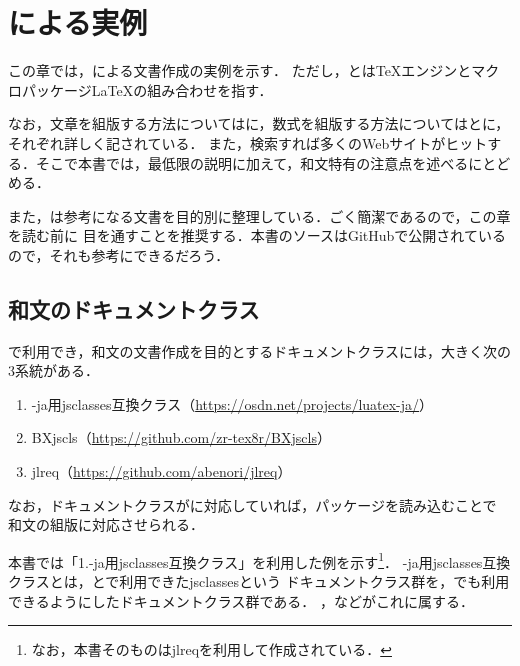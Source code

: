 \documentclass[../../index]{subfiles}
\begin{document}
\chapter{\LuaLaTeX による実例}
\label{chapter:lualatex}
この章では，\LuaLaTeX による文書作成の実例を示す．
ただし，\LuaLaTeX とは\TeX エンジン\LuaTeX とマクロパッケージ\LaTeX の組み合わせを指す．

なお，文章を組版する方法については\cite{Tobias2021}に，数式を組版する方法については\cite{ams2017}と\cite{ams2018}に，それぞれ詳しく記されている．
また，検索すれば多くのWebサイトがヒットする．そこで本書では，最低限の説明に加えて，和文特有の注意点を述べるにとどめる．

また，\cite{Manuel2021}は参考になる文書を目的別に整理している．ごく簡潔であるので，この章を読む前に
目を通すことを推奨する．本書のソースはGitHubで公開されているので，それも参考にできるだろう．

\section{和文のドキュメントクラス}
\LuaLaTeX で利用でき，和文の文書作成を目的とするドキュメントクラスには，大きく次の3系統がある．

\begin{enumerate}
  \item \LuaLaTeX -ja用jsclasses互換クラス（\url{https://osdn.net/projects/luatex-ja/}）
  \item BXjscls（\url{https://github.com/zr-tex8r/BXjscls}）
  \item jlreq（\url{https://github.com/abenori/jlreq}）
\end{enumerate}

なお，ドキュメントクラスが\LuaLaTeX に対応していれば，パッケージを読み込むことで
和文の組版に対応させられる．

本書では「1.\LuaLaTeX -ja用jsclasses互換クラス」を利用した例を示す\footnote{なお，本書そのものはjlreqを利用して作成されている．}．
\LuaLaTeX -ja用jsclasses互換クラスとは，\pLaTeX と\upLaTeX で利用できたjsclassesという
ドキュメントクラス群を，\LuaLaTeX でも利用できるようにしたドキュメントクラス群である．
，などがこれに属する．
\end{document}
